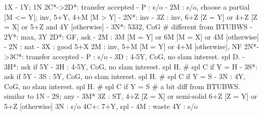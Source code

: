 1X - 1Y; 1N
2C*->2D*: transfer accepted
        - P  : s/o
        - 2M : s/o, choose a partial [M <= Y]; inv, 5+Y, 4+M [M > Y]
        - 2N*: inv
        - 3Z : inv, 6+Z [Z = Y] or 4+Z [Z = X] or 5+Z and 4Y [otherwise]
        - 3N*: 5332, CoG  # different from BTUBWS
   - 2Y*: max, 3Y
2D*: GF, ask 
   - 2M : 3M [M = Y] or 6M [M = X] or 4M [otherwise]
   - 2N : nat
   - 3X : good 5+X
2M : inv, 5+M [M = Y] or 4+M [otherwise], NF
2N*->3C*: transfer accepted
        - P  : s/o
        - 3D : 4-5Y, CoG, no slam interest. spl D.
             - 3H*: ask if 5Y
        - 3H : 4-5Y, CoG, no slam interest. spl H.  # spl C if Y = H
             - 3S*: ask if 5Y
        - 3S : 5Y, CoG, no slam interest. spl H.  # spl C if Y = S
        - 3N : 4Y, CoG, no slam interest. spl H.  # spl C if Y = S
        # a bit diff from BTUBWS. similar to 1N - 2S; any - 3M*
3Z : ST, 4+Z [Z = X] or semi-solid 6+Z [Z = Y] or 5+Z [otherwise]
3N : s/o
4C+: 7+Y, spl  
   - 4M : waste
4Y : s/o
